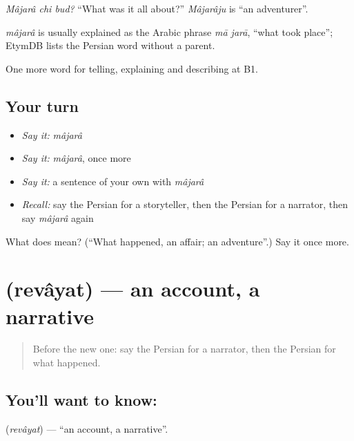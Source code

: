 \emph{Mâjarâ chi bud?} \textquotedblleft{}What was it all about?\textquotedblright{} \emph{Mâjarâju} is \textquotedblleft{}an adventurer\textquotedblright{}.

\begin{cousinweb}
\emph{mâjarâ} is usually explained as the Arabic phrase \emph{mā jarā}, \textquotedblleft{}what took place\textquotedblright{}; EtymDB lists the Persian word without a parent.
\end{cousinweb}

\begin{grammarlens}[title={What you've built}]
One more word for telling, explaining and describing at B1.
\end{grammarlens}

\subsection*{Your turn}
\begin{itemize}
\raggedright
  \item \emph{Say it:} \emph{mâjarâ}
  \item \emph{Say it:} \emph{mâjarâ}, once more
  \item \emph{Say it:} a sentence of your own with \emph{mâjarâ}
  \item \emph{Recall:} say the Persian for a storyteller, then the Persian for a narrator, then say \emph{mâjarâ} again
\end{itemize}

\begin{tcolorbox}[breakable,colback=teal!4,colframe=teal!35!black,title={Before you move on}]
What does  mean? (\textquotedblleft{}What happened, an affair; an adventure\textquotedblright{}.) Say it once more.
\end{tcolorbox}
\section[\texorpdfstring{\fa{روایت} (revâyat)}{روایت (revâyat)}]{ (revâyat) — an account, a narrative}

\label{lesson:FA-C346-revayat}



\begin{quote}
Before the new one: say the Persian for a narrator, then the Persian for what happened.
\end{quote}

\subsection*{You'll want to know: }
\textbf{} (\emph{revâyat}) — \textquotedblleft{}an account, a narrative\textquotedblright{}.

